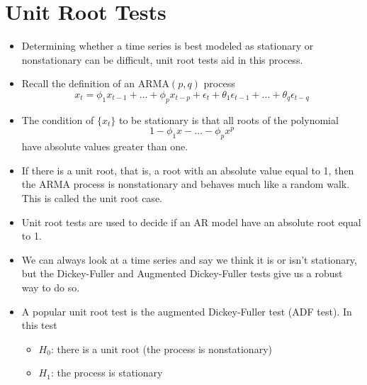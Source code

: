 \documentclass[11pt]{article}
\begin{document}
\section{Unit Root Tests}
\begin{itemize}
    \item Determining whether a time series is best modeled as stationary or nonstationary can
    be difficult, unit root tests aid in this process. 
    \item Recall the definition of an $\text{ARMA}(p,q)$ process
    \[x_t = \phi_1 x_{t-1} + \hdots + \phi_p x_{t-p} + \epsilon_t + \theta_1 \epsilon_{t-1} + 
    \hdots + \theta_q \epsilon_{t-q}\]
    \item The condition of $\{x_t\}$ to be stationary is that all roots of the polynomial 
    \[1 - \phi_1 x - \hdots - \phi_p x^p\] 
    have absolute values greater than one.
    \item If there is a unit root, that is, a root with an absolute value equal to 1, then the 
    ARMA process is nonstationary and behaves much like a random walk. This is called the unit 
    root case. 
    \item Unit root tests are used to decide if an AR model have an absolute root equal to 1.
    \item We can always look at a time series and say we think it is or isn't stationary, but 
    the Dickey-Fuller and Augmented Dickey-Fuller tests give us a robust way to do so. 
    \item A popular unit root test is the augmented Dickey-Fuller test (ADF test). In this test
    \begin{itemize}
        \item $H_0$: there is a unit root (the process is nonstationary)
        \item $H_1$: the process is stationary
    \end{itemize} 
\end{itemize}
\end{document}
